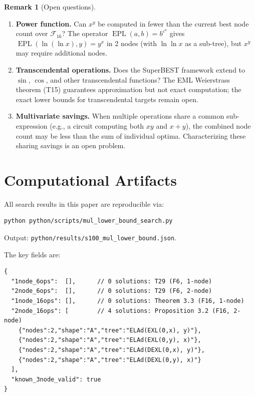 \documentclass[12pt,a4paper]{article}
\theoremstyle{definition}
\newtheorem{remark}[theorem]{Remark}
\newcommand{\EPL}{\operatorname{EPL}}
\begin{document}
\begin{remark}[Open questions]
\begin{enumerate}
  \item \textbf{Power function.}  Can $x^y$ be computed in fewer than the
        current best node count over $\mathcal{F}_{16}$?  The operator
        $\EPL(a,b)=b^{e^a}$ gives $\EPL(\ln(\ln x),y)=y^x$ in 2 nodes
        (with $\ln\ln x$ as a sub-tree), but $x^y$ may require additional
        nodes.

  \item \textbf{Transcendental operations.}  Does the SuperBEST framework
        extend to $\sin$, $\cos$, and other transcendental functions?
        The EML Weierstrass theorem (T15) guarantees approximation but not
        exact computation; the exact lower bounds for transcendental targets
        remain open.

  \item \textbf{Multivariate savings.}  When multiple operations share a
        common sub-expression (e.g., a circuit computing both $xy$ and
        $x+y$), the combined node count may be less than the sum of individual
        optima.  Characterizing these sharing savings is an open problem.
\end{enumerate}
\end{remark}

\section*{Computational Artifacts}

All search results in this paper are reproducible via:
\begin{verbatim}
python python/scripts/mul_lower_bound_search.py
\end{verbatim}
Output: \texttt{python/results/s100\_mul\_lower\_bound.json}.

The key fields are:
\begin{verbatim}
{
  "1node_6ops":  [],      // 0 solutions: T29 (F6, 1-node)
  "2node_6ops":  [],      // 0 solutions: T29 (F6, 2-node)
  "1node_16ops": [],      // 0 solutions: Theorem 3.3 (F16, 1-node)
  "2node_16ops": [        // 4 solutions: Proposition 3.2 (F16, 2-node)
    {"nodes":2,"shape":"A","tree":"ELAd(EXL(0,x), y)"},
    {"nodes":2,"shape":"A","tree":"ELAd(EXL(0,y), x)"},
    {"nodes":2,"shape":"A","tree":"ELAd(DEXL(0,x), y)"},
    {"nodes":2,"shape":"A","tree":"ELAd(DEXL(0,y), x)"}
  ],
  "known_3node_valid": true
}
\end{verbatim}
\end{document}
